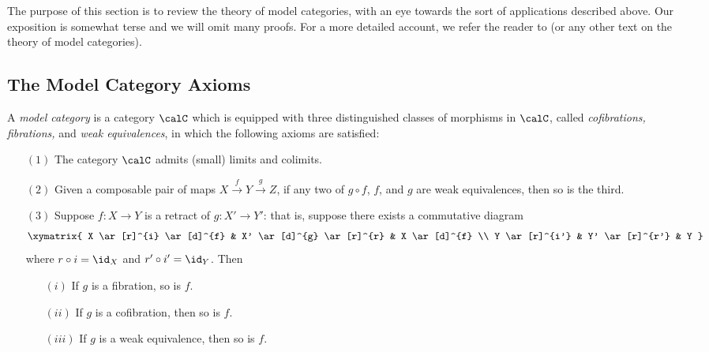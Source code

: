 \begin{Model Categories}
\begin{Already Read}

The purpose of this section is to review the theory of model categories, with an eye towards the sort of applications described above. Our exposition is somewhat terse and we will omit many proofs.
For a more detailed account, we refer the reader to \cite{hovey} (or any other text on the theory of model categories).

\subsection{The Model Category Axioms}

\begin{definition}\label{modelcatdef}
A {\it model category} is a category $\calC$ which is equipped with three distinguished classes of morphisms in $\calC$, called {\it cofibrations, fibrations,} and {\it weak equivalences}, in which the following axioms are satisfied:
\begin{itemize}
\item[$(1)$] The category $\calC$ admits (small) limits and colimits.
\item[$(2)$] Given a composable pair of maps $X \stackrel{f}{\rightarrow} Y \stackrel{g}{\rightarrow} Z$, if any two of $g \circ f$, $f$, and $g$ are weak equivalences, then so is the third.
\item[$(3)$] Suppose $f: X \rightarrow Y$ is a retract of $g: X' \rightarrow Y'$: that is, suppose
there exists a commutative diagram
$$ \xymatrix{ X \ar[r]^{i} \ar[d]^{f} & X' \ar[d]^{g} \ar[r]^{r} & X \ar[d]^{f} \\
Y \ar[r]^{i'} & Y' \ar[r]^{r'} & Y } $$
where $r \circ i = \id_X$ and $r' \circ i' = \id_Y$. Then
\begin{itemize}
\item[$(i)$] If $g$ is a fibration, so is $f$.
\item[$(ii)$] If $g$ is a cofibration, then so is $f$.
\item[$(iii)$] If $g$ is a weak equivalence, then so is $f$.
\end{itemize}


\end{itemize}
\end{definition}
\end{Already Read}
\end{Model Categories}
